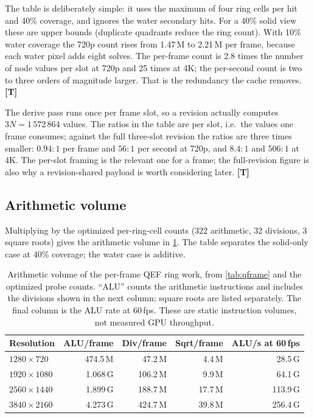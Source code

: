 \documentclass[11pt,a4paper]{article}
\newcommand{\evT}{\textsf{\textbf{\color{evT}[T]}}}
\theoremstyle{plain}
\theoremstyle{definition}
\theoremstyle{remark}
\begin{document}
The table is deliberately simple: it uses the maximum of four ring cells per
hit and 40\% coverage, and ignores the water secondary hits. For a 40\% solid
view these are upper bounds (duplicate quadrants reduce the ring count). With
10\% water coverage the 720p count rises from 1.47\,M to 2.21\,M per frame,
because each water pixel adds eight solves. The per-frame count is 2.8 times
the number of node values per slot at 720p and
25 times at 4K; the per-second count is two to three orders of magnitude
larger. That is the redundancy the cache removes. \evT

The derive pass runs once per frame slot, so a revision actually computes
$3N=1\,572\,864$ values. The ratios in the table are per slot, i.e.\ the values
one frame consumes; against the full three-slot revision the ratios are three
times smaller: $0.94{:}1$ per frame and $56{:}1$ per second at 720p, and
$8.4{:}1$ and $506{:}1$ at 4K. The per-slot framing is the relevant one for a
frame; the full-revision figure is also why a revision-shared payload is
worth considering later. \evT

\subsection{Arithmetic volume}

Multiplying by the optimized per-ring-cell counts (322 arithmetic, 32
divisions, 3 square roots) gives the arithmetic volume in
\cref{tab:arith}. The table separates the solid-only case at 40\% coverage;
the water case is additive.

\begin{table}[H]
\centering
\small
\caption{Arithmetic volume of the per-frame QEF ring work, from
\cref{tab:qframe} and the optimized probe counts. ``ALU'' counts the
arithmetic instructions and includes the divisions shown in the next column;
square roots are listed separately. The final column is the ALU rate at
60\,fps. These are static instruction volumes, not measured GPU throughput.}
\label{tab:arith}
\begin{tabular}{@{}lrrrr@{}}
\toprule
Resolution & ALU/frame & Div/frame & Sqrt/frame & ALU/s at 60\,fps \\
\midrule
$1280\times720$  & 474.5\,M & 47.2\,M & 4.4\,M & 28.5\,G \\
$1920\times1080$ & 1.068\,G & 106.2\,M & 9.9\,M & 64.1\,G \\
$2560\times1440$ & 1.899\,G & 188.7\,M & 17.7\,M & 113.9\,G \\
$3840\times2160$ & 4.273\,G & 424.7\,M & 39.8\,M & 256.4\,G \\
\bottomrule
\end{tabular}
\end{table}
\end{document}
